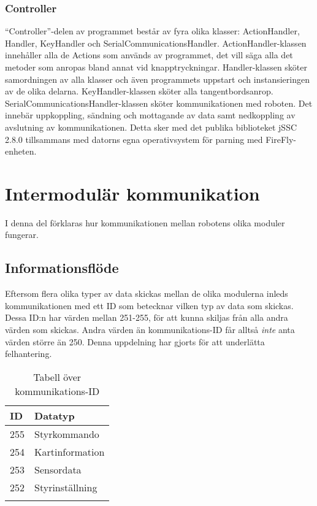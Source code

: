 \documentclass[11pt]{article}
\begin{document}
\begin{flushleft}
\subsubsection{Controller}
``Controller''-delen av programmet består av fyra olika klasser: ActionHandler, Handler, KeyHandler och SerialCommunicationsHandler. 
ActionHandler-klassen innehåller alla de Actions som används av programmet, det vill säga alla det metoder som anropas bland annat vid knapptryckningar.
Handler-klassen sköter samordningen av alla klasser och även programmets uppstart och instansieringen av de olika delarna.
KeyHandler-klassen sköter alla tangentbordsanrop.
SerialCommunicationsHandler-klassen sköter kommunikationen med roboten. Det innebär uppkoppling, sändning och mottagande av data samt nedkoppling av avslutning av kommunikationen. Detta sker med det publika biblioteket jSSC 2.8.0 tillsammans med datorns egna operativsystem för parning med FireFly-enheten.

\pagebreak

\section{Intermodulär kommunikation}
I denna del förklaras hur kommunikationen mellan robotens olika moduler fungerar.

\subsection{Informationsflöde}
Eftersom flera olika typer av data skickas mellan de olika modulerna inleds kommunikationen med ett ID som betecknar vilken typ av data som skickas. Dessa ID:n har värden mellan 251-255, för att kunna skiljas från alla andra värden som skickas. Andra värden än kommunikations-ID får alltså \emph{inte} anta värden större än 250. Denna uppdelning har gjorts för att underlätta felhantering.

\begin{longtable}[l]{| l | l |} \hline
\textbf{ID} & \textbf{Datatyp} \\ \hline 
255 & Styrkommando \\ \hline
254 & Kartinformation \\ \hline
253 & Sensordata \\ \hline
252 & Styrinställning \\ \hline

\caption{Tabell över kommunikations-ID}\label{kommunikationstab}
\end{longtable}


\end{flushleft}
\end{document}

